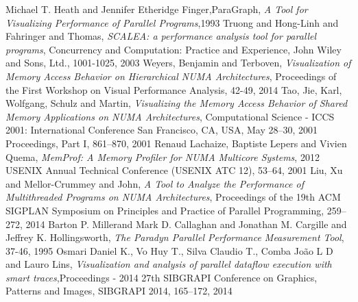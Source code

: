 \documentclass[journal,transmag]{IEEEtran}
\begin{document}
\begin{thebibliography}{1}


Michael T. Heath and Jennifer Etheridge Finger,ParaGraph, \emph {A Tool for Visualizing Performance of Parallel Programs},1993
Truong and Hong-Linh and Fahringer and Thomas, \emph{SCALEA: a performance analysis tool for parallel programs}, Concurrency and Computation: Practice and Experience, John Wiley and Sons, Ltd., 1001-1025, 2003 
Weyers, Benjamin and Terboven, \emph{Visualization of Memory Access Behavior on Hierarchical NUMA Architectures}, Proceedings of the First Workshop on Visual Performance Analysis, 42-49, 2014
Tao, Jie, Karl, Wolfgang, Schulz and Martin, \emph{Visualizing the Memory Access Behavior of Shared Memory Applications on NUMA Architectures}, Computational Science - ICCS 2001: International Conference San Francisco, CA, USA, May 28--30, 2001 Proceedings, Part I, 861--870, 2001
Renaud Lachaize, Baptiste Lepers and Vivien Quema, \emph{MemProf: A Memory Profiler for NUMA Multicore Systems}, 2012 USENIX Annual Technical Conference (USENIX ATC 12), 53--64, 2001
Liu, Xu and Mellor-Crummey and John,  \emph{A Tool to Analyze the Performance of Multithreaded Programs on NUMA Architectures}, Proceedings of the 19th ACM SIGPLAN Symposium on Principles and Practice of Parallel Programming, 259--272, 2014
Barton P. Millerand Mark D. Callaghan and Jonathan M. Cargille and Jeffrey K. Hollingsworth,  \emph{The Paradyn Parallel Performance Measurement Tool}, 37-46, 1995
Osmari Daniel K., Vo Huy T., Silva Claudio T., Comba João L D and Lauro Lins, \emph{Visualization and analysis of parallel dataflow execution with smart traces},Proceedings - 2014 27th SIBGRAPI Conference on Graphics, Patterns and Images, SIBGRAPI 2014, 165--172, 2014 
%
\end{thebibliography}
%
%
%
%
%
\end{document}
